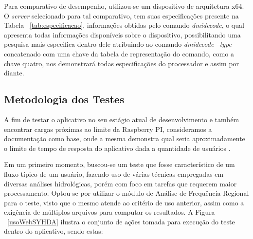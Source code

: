 \documentclass[12pt,english,brazil]{article}
\begin{document}
Para comparativo de desempenho, utilizou-se um dispositivo de arquitetura x64.
O \textit{server} selecionado para tal comparativo, tem suas especificações presente na Tabela ~\ref{tab:especificacao}, informações obtidas pelo comando \textit{dmidecode}, o qual apresenta todas informações disponíveis sobre o dispositivo, possibilitando uma pesquisa mais especifica dentro dele atribuindo ao comando \textit{dmidecode --type} concatenado com uma chave da tabela de representação do comando, como a chave quatro, nos demonstrará todas especificações do processador e assim por diante.

\subsection{Metodologia dos Testes}\label{sec:MetodologiaDosTestes}
A fim de testar o aplicativo no seu estágio atual de desenvolvimento e também encontrar cargas próximas ao limite da Raspberry PI, consideramos a documentação como base, onde a mesma demonstra qual seria aproximadamente o limite de tempo de resposta do aplicativo dada a quantidade de usuários \cite{documentShiny}.


Em um primeiro momento, buscou-se um teste que fosse característico de um fluxo típico de um usuário, fazendo uso de várias técnicas empregadas em diversas análises hidrológicas, porém com foco em tarefas que requerem maior processamento. Optou-se por utilizar o módulo de Análise de Frequência Regional para o teste, visto que o mesmo atende ao critério de uso anterior, assim como a exigência de múltiplos arquivos para computar os resultados. A Figura ~\ref{usoWebSYHDA} ilustra o conjunto de ações tomada para execução do teste dentro do aplicativo, sendo estas:

\end{document}
